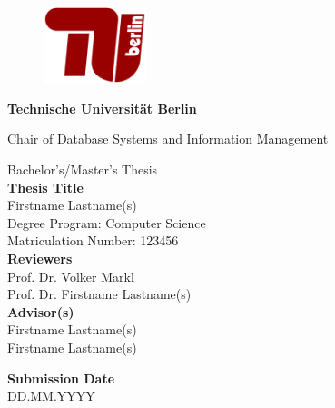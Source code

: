 \thispagestyle{empty}
\begin{center}

\begin{figure}[t]
    \centering
    \includegraphics[width=3cm]{./img/TU-Berlin-Logo.pdf}%
\end{figure}

{\LARGE \textbf{Technische Universit\"at Berlin}}

\vspace{0.5cm}

{\large Chair of Database Systems and Information Management\\[1.6mm]}


\vspace{2.0cm}

{\LARGE Bachelor's/Master's Thesis}\\

\vspace{2.5cm}
{\LARGE \textbf{Thesis Title}}\\
\vspace{1.0cm}
Firstname Lastname(s) \\
Degree Program: Computer Science\\
Matriculation Number: 123456\\

\vspace*{2.5cm}
\textbf{Reviewers}\\
Prof. Dr. Volker Markl\\
Prof. Dr. Firstname Lastname(s)\\
\vspace*{0.5cm}
\textbf{Advisor(s)}\\
Firstname Lastname(s)\\
Firstname Lastname(s)\\
\vspace{0.5 cm}

\textbf{Submission Date}\\
DD.MM.YYYY\\ %
\end{center}

